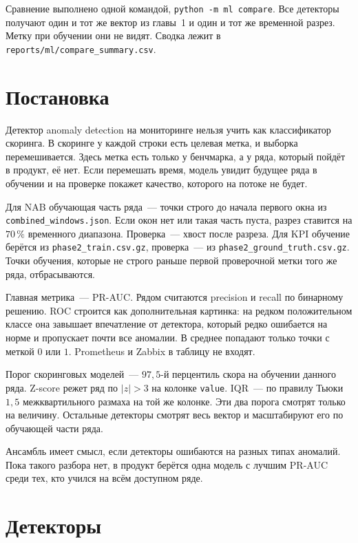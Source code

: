 Сравнение выполнено одной командой, \texttt{python -m ml compare}.
Все детекторы получают один и тот же вектор из главы~1 и один и тот же временной разрез.
Метку при обучении они не видят.
Сводка лежит в \texttt{reports/ml/compare\_summary.csv}.

\section{Постановка}

Детектор anomaly detection на мониторинге нельзя учить как классификатор скоринга.
В скоринге у каждой строки есть целевая метка, и выборка перемешивается.
Здесь метка есть только у бенчмарка, а у ряда, который пойдёт в продукт, её нет.
Если перемешать время, модель увидит будущее ряда в обучении и на проверке покажет качество, которого на потоке не будет.

Для NAB обучающая часть ряда~--- точки строго до начала первого окна из \texttt{combined\_windows.json}.
Если окон нет или такая часть пуста, разрез ставится на \(70\,\%\) временного диапазона.
Проверка~--- хвост после разреза.
Для KPI обучение берётся из \texttt{phase2\_train.csv.gz}, проверка~--- из \texttt{phase2\_ground\_truth.csv.gz}.
Точки обучения, которые не строго раньше первой проверочной метки того же ряда, отбрасываются.

Главная метрика~--- PR-AUC.
Рядом считаются precision и recall по бинарному решению.
ROC строится как дополнительная картинка: на редком положительном классе она завышает впечатление от детектора, который редко ошибается на норме и пропускает почти все аномалии.
В среднее попадают только точки с меткой \(0\) или \(1\).
Prometheus и Zabbix в таблицу не входят.

Порог скоринговых моделей~--- \(97{,}5\)-й перцентиль скора на обучении данного ряда.
Z-score режет ряд по \(|z|>3\) на колонке \texttt{value}.
IQR~--- по правилу Тьюки \(1{,}5\) межквартильного размаха на той же колонке.
Эти два порога смотрят только на величину.
Остальные детекторы смотрят весь вектор и масштабируют его по обучающей части ряда.

Ансамбль имеет смысл, если детекторы ошибаются на разных типах аномалий.
Пока такого разбора нет, в продукт берётся одна модель с лучшим PR-AUC среди тех, кто учился на всём доступном ряде.

\section{Детекторы}

